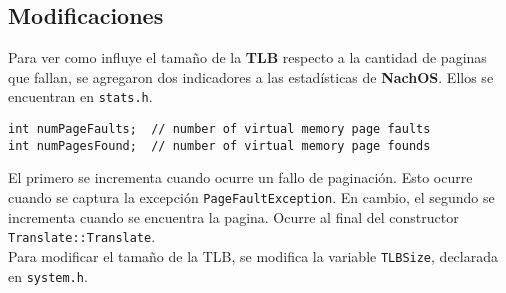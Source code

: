 \subsection*{Modificaciones}
Para ver como influye el tamaño de la \textbf{TLB} respecto a la cantidad de paginas que fallan, se agregaron dos indicadores a las estadísticas de \textbf{NachOS}. Ellos se encuentran en \texttt{stats.h}.
\begin{lstlisting}[style=C]
int numPageFaults;  // number of virtual memory page faults
int numPagesFound;  // number of virtual memory page founds
\end{lstlisting}
El primero se incrementa cuando ocurre un fallo de paginación. Esto ocurre cuando se captura la excepción \texttt{PageFaultException}. En cambio, el segundo se incrementa cuando se encuentra la pagina. Ocurre al final del constructor \texttt{Translate::Translate}.\\
Para modificar el tamaño de la TLB, se modifica la variable \texttt{TLBSize}, declarada en \texttt{system.h}.
